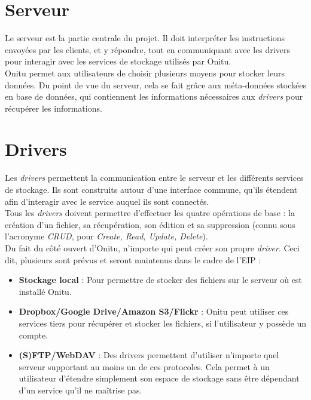\section{Serveur}
Le serveur est la partie centrale du projet. Il doit interpréter les instructions envoyées par les clients, et y répondre, tout en communiquant avec les drivers pour interagir avec les services de stockage utilisés par Onitu.\\

Onitu permet aux utilisateurs de choisir plusieurs moyens pour stocker leurs données. Du point de vue du serveur, cela se fait grâce aux méta-données stockées en base de données, qui contiennent les informations nécessaires aux \textit{drivers} pour récupérer les informations.\\

\section{Drivers}
Les \textit{drivers} permettent la communication entre le serveur et les différents services de stockage. Ils sont construits autour d'une interface commune, qu'ils étendent afin d'interagir avec le service auquel ils sont connectés.\\

Tous les \textit{drivers} doivent permettre d'effectuer les quatre opérations de base : la création d'un fichier, sa récupération, son édition et sa suppression (connu sous l'acronyme \textit{CRUD}, pour \textit{Create, Read, Update, Delete}).\\

Du fait du côté ouvert d'Onitu, n'importe qui peut créer son propre \textit{driver}. Ceci dit, plusieurs sont prévus et seront maintenus dans le cadre de l'EIP :
\begin{itemize}
\renewcommand{\labelitemi}{$\bullet$}
    \item \textbf{Stockage local} : Pour permettre de stocker des fichiers sur le serveur où est installé Onitu.
    \item \textbf{Dropbox/Google Drive/Amazon S3/Flickr} : Onitu peut utiliser ces services tiers pour récupérer et stocker les fichiers, si l'utilisateur y possède un compte.
    \item \textbf{(S)FTP/WebDAV} : Des drivers permettent d'utiliser n'importe quel serveur supportant au moins un de ces protocoles. Cela permet à un utilisateur d'étendre simplement son espace de stockage sans être dépendant d'un service qu'il ne maîtrise pas.
\end{itemize}

